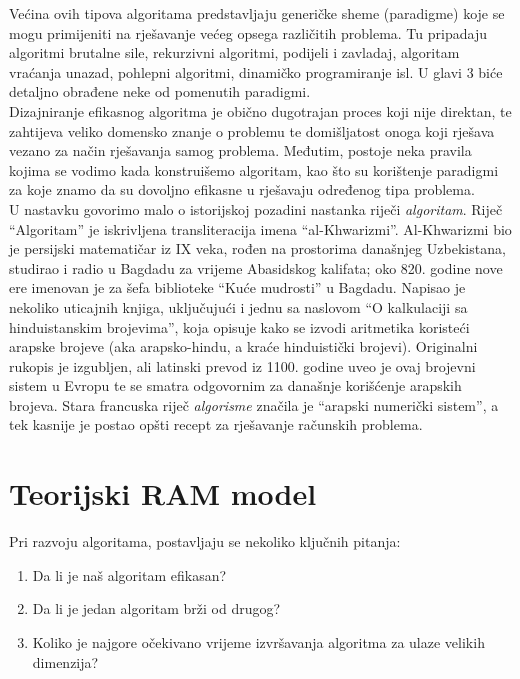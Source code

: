    Većina ovih tipova algoritama predstavljaju generičke sheme (paradigme) koje se mogu primijeniti na  rješavanje većeg opsega različitih problema. Tu pripadaju algoritmi brutalne sile, rekurzivni algoritmi, podijeli i zavladaj, algoritam vraćanja unazad, pohlepni algoritmi, dinamičko programiranje isl. U glavi 3 biće detaljno obrađene  neke od pomenutih paradigmi. \\
  
Dizajniranje efikasnog algoritma je obično dugotrajan proces koji nije direktan, te zahtijeva veliko domensko znanje o problemu te domišljatost onoga koji rješava vezano za način rješavanja samog  problema.  Međutim, postoje neka pravila kojima se vodimo kada konstruišemo algoritam, kao što su korištenje paradigmi za koje znamo da su dovoljno efikasne u rješavaju određenog tipa problema. 
 \\ 
 
 U nastavku govorimo malo o istorijskoj pozadini nastanka riječi \textit{algoritam}. Riječ ``Algoritam'' je iskrivljena transliteracija imena ``al-Khwarizmi''. Al-Khwarizmi bio je persijski matematičar iz IX veka, rođen na prostorima današnjeg Uzbekistana, studirao i radio u Bagdadu za vrijeme Abasidskog kalifata; oko 820. godine nove ere imenovan je za
  šefa biblioteke ``Kuće mudrosti'' u Bagdadu. Napisao je nekoliko
 uticajnih knjiga, uključujući i jednu sa naslovom ``O kalkulaciji sa hinduistanskim brojevima'', koja opisuje kako se izvodi aritmetika koristeći arapske brojeve (aka arapsko-hindu, a kraće hinduistički brojevi). Originalni rukopis je izgubljen, ali latinski prevod iz 
 1100. godine uveo je ovaj brojevni sistem u Evropu te se smatra odgovornim  za današnje korišćenje  arapskih brojeva.   Stara francuska riječ \textit{algorisme} značila je
 ``arapski numerički sistem'', a tek kasnije je postao opšti recept za rješavanje računskih problema.

\section{Teorijski RAM model}

Pri razvoju algoritama, postavljaju se nekoliko ključnih pitanja: 
\begin{enumerate}
	\item Da li je naš algoritam efikasan? 
	\item Da li je jedan algoritam brži od drugog? 
	\item Koliko je najgore očekivano vrijeme izvršavanja algoritma za ulaze velikih dimenzija? 
\end{enumerate}
 

